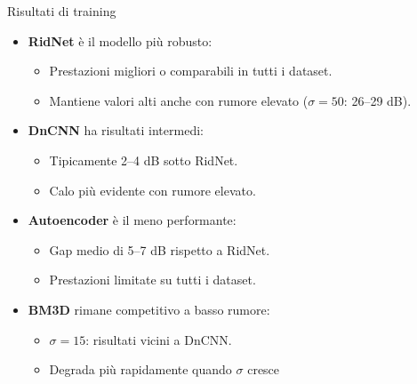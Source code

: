 \documentclass{beamer}
\begin{document}
\begin{frame}{Risultati di training}
  \begin{itemize}
    \item \textbf{RidNet} è il modello più robusto:
      \begin{itemize}
        \item Prestazioni migliori o comparabili in tutti i dataset.
        \item Mantiene valori alti anche con rumore elevato ($\sigma=50$: 26–29 dB).
      \end{itemize}
    \item \textbf{DnCNN} ha risultati intermedi:
      \begin{itemize}
        \item Tipicamente 2–4 dB sotto RidNet.
        \item Calo più evidente con rumore elevato.
      \end{itemize}
    \item \textbf{Autoencoder} è il meno performante:
      \begin{itemize}
        \item Gap medio di 5–7 dB rispetto a RidNet.
        \item Prestazioni limitate su tutti i dataset.
      \end{itemize}
    \item \textbf{BM3D} rimane competitivo a basso rumore:
      \begin{itemize}
        \item $\sigma=15$: risultati vicini a DnCNN.
        \item Degrada più rapidamente quando $\sigma$ cresce
      \end{itemize}
  \end{itemize}
\end{frame}






\end{document}
